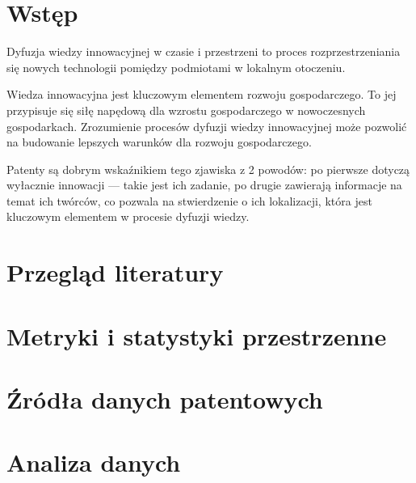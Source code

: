 \documentclass[12pt, withmarginpar]{mwbk}
\begin{document}


\tableofcontents

\chapter*{Wstęp}

Dyfuzja wiedzy innowacyjnej w czasie i przestrzeni to proces
rozprzestrzeniania się nowych technologii pomiędzy podmiotami
w lokalnym otoczeniu.

Wiedza innowacyjna jest kluczowym elementem rozwoju gospodarczego.
To jej przypisuje się siłę napędową dla wzrostu gospodarczego
w nowoczesnych gospodarkach. Zrozumienie procesów dyfuzji 
wiedzy innowacyjnej może pozwolić na budowanie lepszych 
warunków dla rozwoju gospodarczego.

Patenty są dobrym wskaźnikiem tego zjawiska z 2 powodów:
po pierwsze dotyczą wyłacznie innowacji --- takie jest ich zadanie,
po drugie zawierają informacje na temat ich twórców, co pozwala
na stwierdzenie o ich lokalizacji, która jest kluczowym elementem
w procesie dyfuzji wiedzy.

\chapter{Przegląd literatury}\label{ch:intro}



\chapter{Metryki i statystyki przestrzenne}\label{ch:metric}



\chapter{Źródła danych patentowych}\label{ch:data}











\chapter{Analiza danych}


\end{document}
